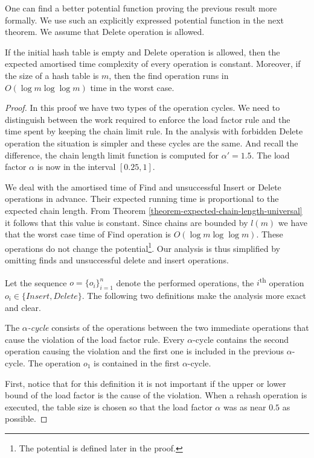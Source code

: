 One can find a better potential function proving the previous result more formally. We use such an explicitly expressed potential function in the next theorem. We assume that Delete operation is allowed.
\begin{theorem}
\label{theorem-delete-time}
If the initial hash table is empty and Delete operation is allowed, then the expected amortised time complexity of every operation is constant. Moreover, if the size of a hash table is $m$, then the find operation runs in $O(\log m \log \log m)$ time in the worst case.
\end{theorem}
\begin{proof}
In this proof we have two types of the operation cycles. We need to distinguish between the work required to enforce the load factor rule and the time spent by keeping the chain limit rule. In the analysis with forbidden Delete operation the situation is simpler and these cycles are the same. And recall the difference, the chain length limit function is computed for $\alpha' = 1.5$. The load factor $\alpha$ is now in the interval $\left[0.25, 1\right]$.

We deal with the amortised time of Find and unsuccessful Insert or Delete operations in advance. Their expected running time is proportional to the expected chain length. From Theorem \ref{theorem-expected-chain-length-universal} it follows that this value is constant. Since chains are bounded by $l(m)$ we have that the worst case time of Find operation is $O(\log m \log \log m)$. These operations do not change the potential\footnote{The potential is defined later in the proof.}. Our analysis is thus simplified by omitting finds and unsuccessful delete and insert operations.

Let the sequence $o = \{o_i\}_{i=1}^{n}$ denote the performed operations, the $i$\textsuperscript{th} operation $o_i \in \lbrace Insert, Delete \rbrace$. The following two definitions make the analysis more exact and clear.

\begin{definition}
The \emph{$\alpha$-cycle} consists of the operations between the two immediate operations that cause the violation of the load factor rule. Every $\alpha$-cycle contains the second operation causing the violation and the first one is included in the previous $\alpha$-cycle. The operation $o_1$ is contained in the first $\alpha$-cycle.
\end{definition}
First, notice that for this definition it is not important if the upper or lower bound of the load factor is the cause of the violation. When a rehash operation is executed, the table size is chosen so that the load factor $\alpha$ was as near $0.5$ as possible. 


\end{proof}
